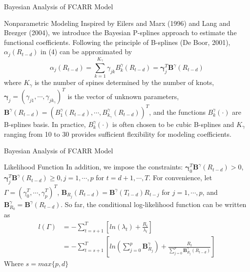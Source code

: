 \documentclass{beamer}
\begin{document}
\begin{frame}{Bayesian Analysis of FCARR Model}
\begin{block}{Nonparametric Modeling}
Inspired by Eilers and Marx (1996) and Lang and Brezger (2004), we introduce the Bayesian P-splines approach to estimate the functional coefficients. Following the principle of B-splines (De Boor, 2001), $\alpha_j(R_{t-d})$ in (4) can be approximated by
\begin{equation}
     \alpha_j(R_{t-d}) = \sum_{k=1}^{K_\gamma}\gamma_{jk}B_k^\gamma(R_{t-d})=\bm{\gamma}_j^T \mathbf{B}^ \gamma(R_{t-d})
\end{equation}  
where $K_{\gamma}$ is the number of spines determined by the number of knots, $\bm{\gamma}_j = (\gamma_{j1},\cdots,\gamma_{jk_{\gamma}})^T$ is the vector of unknown parameters, $\bm{B}^{\gamma}(R_{t-d}) = (B_1^{\gamma}(R_{t-d}), \cdots, B_{k_{\gamma}}^{\gamma}(R_{t-d}))^T$, and the functions $B_k^{\gamma}(\cdot)$ are B-splines basis. In practice, $B_k^{\gamma}(\cdot)$ is often chosen to be cubic B-splines and $K_{\gamma}$ ranging from 10 to 30 provides sufficient flexibility for modeling coefficients. 
\end{block}

\end{frame}

\begin{frame}{Bayesian Analysis of FCARR Model}
\begin{block}{Likelihood Function}
In addition, we impose the constraints: $\bm{\gamma}_0^T \bm{B}^{\gamma}(R_{t-d}) > 0$, $\bm{\gamma}_j^T \bm{B}^{\gamma}(R_{t-d}) \geq 0 , j=1, \cdots , p$ for $t = d+1, \cdots, T$.
For convenience, let $\Gamma = (\gamma_0^T, \cdots ,\gamma_p^T)^T$, $\bm{B}_{R_j}(R_{t-d})=\bm{B}^{\gamma}(T_{t-d})R_{t-j}$ for $j=1, \cdots, p$, and $\bm{B}_{R_0}^{\gamma}=\bm{B}^{\gamma}(R_{t-d})$. So far, the conditional log-likelihood function can be written as
    \begin{equation}
    \begin{aligned}
         l(\Gamma) &= -\sum_{t=s+1}^{T} [ln(\lambda_t) + \frac{R_t}{\lambda_t}] \\
         &= -\sum_{t=s+1}^{T}[ln(\sum_{j=0}^{p}\bm{B}_{R_j}^\gamma) + \frac{R_t}{\sum_{j=0}^p \bm{B}_{R_j}^\gamma (R_{t-d})}]
    \end{aligned}
    \end{equation}
Where  $s=max\{p,d\}$
\end{block}
\end{frame}
\end{document}
